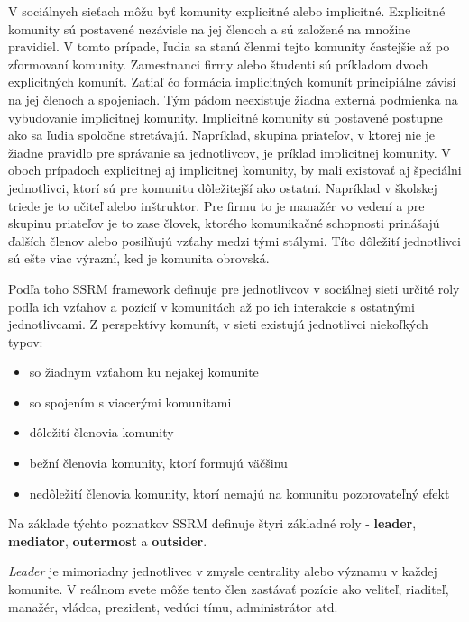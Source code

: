 \documentclass[slovak,master,public,dept460,male,cpdeclaration,oneside]{diploma}
\begin{document}
V sociálnych sieťach môžu byť komunity explicitné alebo implicitné. Explicitné komunity sú postavené nezávisle na jej členoch a sú založené na množine pravidiel. V tomto prípade, ľudia sa stanú členmi tejto komunity častejšie až po zformovaní komunity. Zamestnanci firmy alebo študenti sú príkladom dvoch explicitných komunít. Zatiaľ čo formácia implicitných komunít principiálne závisí na jej členoch a spojeniach. Tým pádom neexistuje žiadna externá podmienka na vybudovanie implicitnej komunity. Implicitné komunity sú postavené postupne ako sa ľudia spoločne stretávajú. Napríklad, skupina priateľov, v ktorej nie je žiadne pravidlo pre správanie sa jednotlivcov, je príklad implicitnej komunity. V oboch prípadoch explicitnej aj implicitnej komunity, by mali existovať aj špeciálni jednotlivci, ktorí sú pre komunitu dôležitejší ako ostatní. Napríklad v školskej triede je to učiteľ alebo inštruktor. Pre firmu to je manažér vo vedení a pre skupinu priateľov je to zase človek, ktorého komunikačné schopnosti prinášajú ďalších členov alebo posilňujú vzťahy medzi tými stálymi. Títo dôležití jednotlivci sú ešte viac výrazní, keď je komunita obrovská.


Podľa toho SSRM framework definuje pre jednotlivcov v sociálnej sieti určité roly podľa ich vzťahov a pozícií v komunitách až po ich interakcie s ostatnými jednotlivcami. Z perspektívy komunít, v sieti existujú jednotlivci niekoľkých typov:

\begin{itemize}
\item so žiadnym vzťahom ku nejakej komunite
\item so spojením s viacerými komunitami
\item dôležití členovia komunity
\item bežní členovia komunity, ktorí formujú väčšinu
\item nedôležití členovia komunity, ktorí nemajú na komunitu pozorovateľný efekt
\end{itemize} 


Na základe týchto poznatkov SSRM definuje štyri základné roly - \textbf{leader}, \textbf{mediator}, \textbf{outermost} a \textbf{outsider}.

\begin{definition}
\textit{Leader} je mimoriadny jednotlivec v zmysle centrality alebo významu v každej komunite.  V reálnom svete môže tento člen zastávať pozície ako veliteľ, riaditeľ, manažér,  vládca, prezident, vedúci tímu, administrátor atd.
\end{definition}
\end{document}
